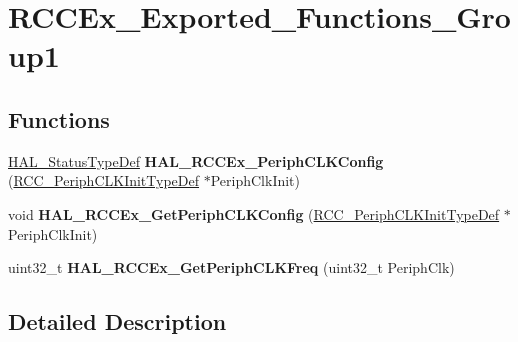 \hypertarget{group___r_c_c_ex___exported___functions___group1}{\section{R\-C\-C\-Ex\-\_\-\-Exported\-\_\-\-Functions\-\_\-\-Group1}
\label{group___r_c_c_ex___exported___functions___group1}
}
\subsection*{Functions}
\begin{DoxyCompactItemize}
\item 
\hypertarget{group___r_c_c_ex___exported___functions___group1_ga0c0f61a1e2f47cc81bc43d83ba3e0d95}{\hyperlink{stm32l1xx__hal__def_8h_a63c0679d1cb8b8c684fbb0632743478f}{H\-A\-L\-\_\-\-Status\-Type\-Def} {\bfseries H\-A\-L\-\_\-\-R\-C\-C\-Ex\-\_\-\-Periph\-C\-L\-K\-Config} (\hyperlink{struct_r_c_c___periph_c_l_k_init_type_def}{R\-C\-C\-\_\-\-Periph\-C\-L\-K\-Init\-Type\-Def} $\ast$Periph\-Clk\-Init)}\label{group___r_c_c_ex___exported___functions___group1_ga0c0f61a1e2f47cc81bc43d83ba3e0d95}

\item 
\hypertarget{group___r_c_c_ex___exported___functions___group1_ga754fc5136c63ad52b7c459aafc8a3927}{void {\bfseries H\-A\-L\-\_\-\-R\-C\-C\-Ex\-\_\-\-Get\-Periph\-C\-L\-K\-Config} (\hyperlink{struct_r_c_c___periph_c_l_k_init_type_def}{R\-C\-C\-\_\-\-Periph\-C\-L\-K\-Init\-Type\-Def} $\ast$Periph\-Clk\-Init)}\label{group___r_c_c_ex___exported___functions___group1_ga754fc5136c63ad52b7c459aafc8a3927}

\item 
\hypertarget{group___r_c_c_ex___exported___functions___group1_ga14acaeb88163a6bb0839470b753ba1bd}{uint32\-\_\-t {\bfseries H\-A\-L\-\_\-\-R\-C\-C\-Ex\-\_\-\-Get\-Periph\-C\-L\-K\-Freq} (uint32\-\_\-t Periph\-Clk)}\label{group___r_c_c_ex___exported___functions___group1_ga14acaeb88163a6bb0839470b753ba1bd}

\end{DoxyCompactItemize}


\subsection{Detailed Description}
